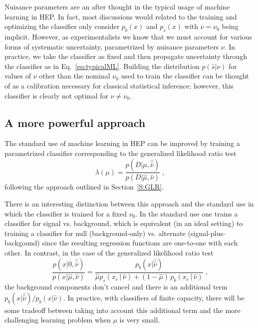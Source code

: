 \documentclass[12pt]{article}
\numberwithin{equation}{section}
\theoremstyle{plain}
\begin{document}
Nuisance parameters are an after thought in the typical usage of machine
learning in HEP. In fact, most discussions would related to the training and
optimizing the classifier only consider $p_b(x)$ and $p_s(x)$ with $\nu=\nu_0$
being implicit. However, as experimentalists we know that we must account for
various forms of systematic uncertainty, parametrized by nuisance parameters
$\nu$. In practice, we take the classifier as fixed and then propagate
uncertainty through the classifier as in Eq.~\ref{eq:typicalML}. Building the
distribution $p(\hat s|\nu)$ for values of $\nu$ other than the nominal $\nu_0$
used to train the classifier can be thought of as a calibration necessary for
classical statistical inference; however, this classifier is clearly not optimal
for $\nu \ne \nu_0$.

\subsection{A more powerful  approach}

The standard use of machine learning in HEP can be improved by training a
parametrized classifier corresponding to the generalized likelihood ratio test
\begin{equation}
\lambda(\mu) = \frac{p(D|\mu, \hat{\hat{\nu}})}{p(D|\hat \mu, {\hat{\nu}})} \;,
\end{equation}
following the approach outlined in Section~\ref{S:GLR}.

There is an interesting distinction between this approach and the standard use
in which the classifier is trained for a fixed $\nu_0$. In the standard use one
trains a classifier for signal vs. background, which is equivalent (in an ideal
setting) to training a classifier for  null (background-only) vs. alternate
(signal-plus-backgound) since the resulting regression functions are one-to-one
with each other. In contrast, in the case of the generalized likelihood ratio
test
\begin{equation}\label{eq:hep_improved}
 \frac{p(x| 0, \hat{\hat{ \nu}})}{p(x|\hat \mu, \hat\nu)} =  \frac{p_b(x| \hat{\hat{ \nu}})}{ \hat \mu p_s( x_e \, |\,  \hat\nu)  + (1- \hat \mu )\, p_b( x_e \,|\, \hat \nu)} \; ,
\end{equation}
the background components don't cancel and there is an additional term $p_b(x|
\hat{\hat{ \nu}})/p_b(x| {\hat{ \nu}})$. In practice, with classifiers of finite
capacity, there will be some tradeoff between taking into account this
additional term and the more challenging learning problem when $\mu$ is very
small.
\end{document}
